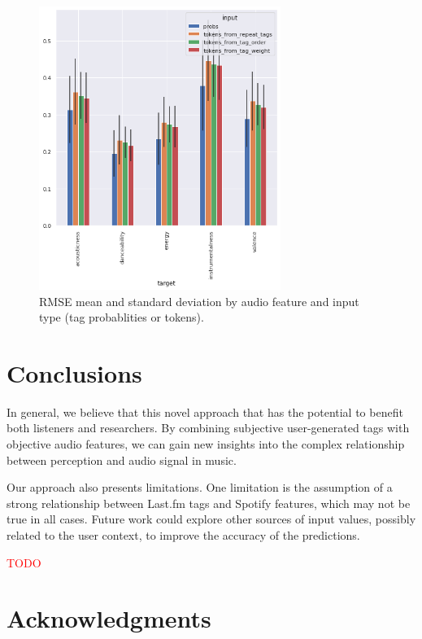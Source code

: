 \documentclass[sn-mathphys]{sn-jnl}%
\theoremstyle{thmstyleone}%
\theoremstyle{thmstyletwo}%
\theoremstyle{thmstylethree}%
\begin{document}
\begin{figure}[h!]
      \centering
      \includegraphics[width=0.7\textwidth]{images/rmse_by_feature_and_input.png}
      \caption{RMSE mean and standard deviation by audio feature and input type (tag probablities or tokens).}
      \label{fig:rmse_by_feature_and_input}
\end{figure}

\section{Conclusions}

In general, we believe that this novel approach that has the potential to benefit both listeners and researchers.
By combining subjective user-generated tags with objective audio features,
we can gain new insights into the complex relationship between perception and audio signal in music.

Our approach also presents limitations.
One limitation is the assumption of a strong relationship between Last.fm tags and Spotify features, which may not be true in all cases.
Future work could explore other sources of input values, possibly related to the user context, to improve the accuracy of the predictions.



\textcolor{red}{TODO}


\section{Acknowledgments}
\end{document}
